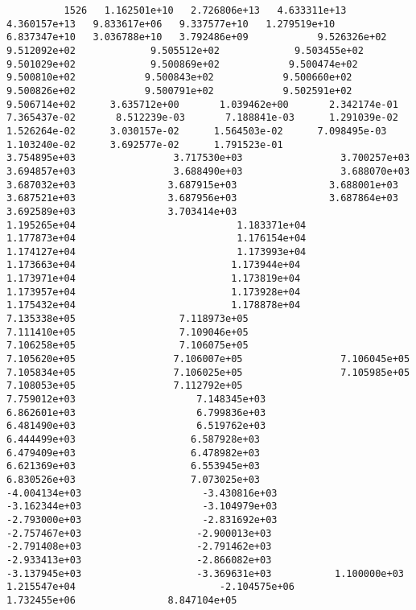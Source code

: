 \documentclass{article}
\begin{document}
{\tiny 
\begin{verbatim}
          1526   1.162501e+10   2.726806e+13   4.633311e+13   4.360157e+13   9.833617e+06   9.337577e+10   1.279519e+10   6.837347e+10   3.036788e+10   3.792486e+09            9.526326e+02             9.512092e+02             9.505512e+02             9.503455e+02             9.501029e+02             9.500869e+02            9.500474e+02            9.500810e+02            9.500843e+02            9.500660e+02            9.500826e+02            9.500791e+02            9.502591e+02            9.506714e+02      3.635712e+00       1.039462e+00       2.342174e-01       7.365437e-02       8.512239e-03       7.188841e-03      1.291039e-02      1.526264e-02      3.030157e-02      1.564503e-02      7.098495e-03      1.103240e-02      3.692577e-02      1.791523e-01                3.754895e+03                 3.717530e+03                 3.700257e+03                 3.694857e+03                 3.688490e+03                 3.688070e+03                3.687032e+03                3.687915e+03                3.688001e+03                3.687521e+03                3.687956e+03                3.687864e+03                3.692589e+03                3.703414e+03                           1.195265e+04                            1.183371e+04                            1.177873e+04                            1.176154e+04                            1.174127e+04                            1.173993e+04                           1.173663e+04                           1.173944e+04                           1.173971e+04                           1.173819e+04                           1.173957e+04                           1.173928e+04                           1.175432e+04                           1.178878e+04                 7.135338e+05                  7.118973e+05                  7.111410e+05                  7.109046e+05                  7.106258e+05                  7.106075e+05                 7.105620e+05                 7.106007e+05                 7.106045e+05                 7.105834e+05                 7.106025e+05                 7.105985e+05                 7.108053e+05                 7.112792e+05                    7.759012e+03                     7.148345e+03                     6.862601e+03                     6.799836e+03                     6.481490e+03                     6.519762e+03                    6.444499e+03                    6.587928e+03                    6.479409e+03                    6.478982e+03                    6.621369e+03                    6.553945e+03                    6.830526e+03                    7.073025e+03                    -4.004134e+03                     -3.430816e+03                     -3.162344e+03                     -3.104979e+03                     -2.793000e+03                     -2.831692e+03                    -2.757467e+03                    -2.900013e+03                    -2.791408e+03                    -2.791462e+03                    -2.933413e+03                    -2.866082e+03                    -3.137945e+03                    -3.369631e+03           1.100000e+03       1.215547e+04                         -2.104575e+06               1.732455e+06                8.847104e+05 

\end{verbatim}}
\end{document}
